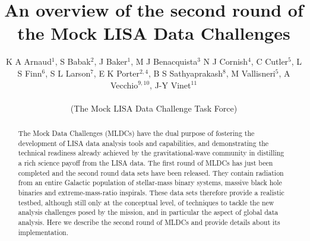 \documentclass[12pt]{iopart}
\begin{document}
\title[The second round of Mock LISA Data Challenges]{An overview of the second round of the Mock LISA Data Challenges}

\author{K A Arnaud$^1$,
S Babak$^2$,
J Baker$^1$,
M J Benacquista$^3$
N J Cornish$^4$,
C Cutler$^{5}$,
L S Finn$^{6}$,
S L Larson$^{7}$,
E K Porter$^{2,4}$,
B S Sathyaprakash$^{8}$,
M Vallisneri$^{5}$,
A Vecchio$^{9,10}$,
J-Y Vinet$^{11}$\\
\centerline{(The Mock LISA Data Challenge Task Force)}
}

\address{$^1$ Gravitational Astrophysics Laboratory, NASA Goddard Space Flight Center, 8800 Greenbelt Rd, Greenbelt, MD 20771, US}
\address{$^2$ Max-Planck-Institut f\"{u}r Gravitationsphysik (Albert-Einstein-Institut), Am M\"{u}hlenberg 1, D-14476 Golm bei Potsdam, Germany}
\address{$^3$ Center for Gravitational Wave Astronomy, University of Texas at Brownsville, Brownsville, TX 78520, US}
\address{$^4$ Dept.\ of Phys., Montana State University, Bozeman, MT 59717, US}
\address{$^{5}$ Jet Propulsion Laboratory, California Institute of Technology, Pasadena, CA 91109, US}
\address{$^{6}$ Center for Gravitational Wave Physics, The Pennsylvania State University, University Park, PA 16802, US}
\address{$^{7}$ Dept.\ of Phys., Weber State University, 2508 University of Circle, Ogden, UT 84408, US}
\address{$^{8}$ Dept.\ of Phys.\ and Astron., Cardiff University, 5, The Parade, Cardiff, CF24 3YB, UK}
\address{$^{9}$ School of Phys.\ and Astron., University of Birmingham, Edgbaston, Birmingham B152TT, UK}
\address{$^{10}$ Dept.\ of Phys.\ and Astron., Northwestern University, Evanston, IL 60208, US}
\address{$^{11}$ Department ARTEMIS, Observatoire de la C\^{o}te d'Azur, BP 429, 06304 Nice, France}
\begin{abstract}
The Mock Data Challenges (MLDCs) have the dual purpose of fostering the development of LISA data analysis tools and capabilities, and demonstrating the technical readiness already achieved by the gravitational-wave community in distilling a rich science payoff from the LISA data. The first round of MLDCs has just been completed and the second round data sets have been released. They contain radiation from an entire Galactic population of stellar-mass binary systems, massive black hole binaries and extreme-mass-ratio inspirals. These data sets therefore provide a realistic testbed, although still only at the conceptual level, of techniques to tackle the new analysis challenges posed by the mission, and in particular the aspect of global data analysis. Here we describe the second round of MLDCs and provide details about its implementation.

\end{abstract}
\end{document}
